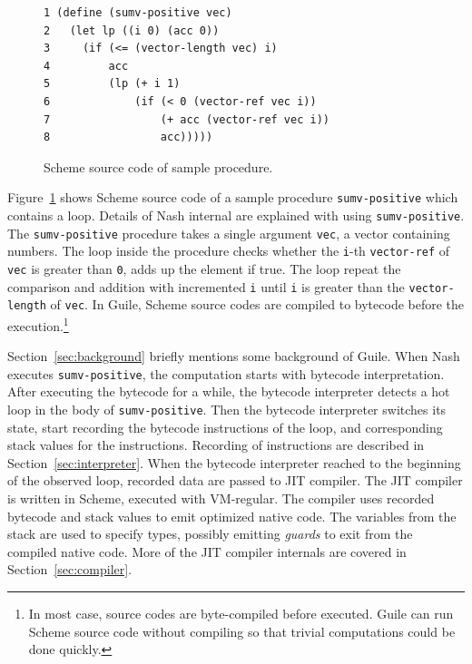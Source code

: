 \documentclass[preprint, 10pt]{sigplanconf}
\begin{document}
\begin{figure}
  \begin{center}
    \small
\begin{verbatim}
1 (define (sumv-positive vec)
2   (let lp ((i 0) (acc 0))
3     (if (<= (vector-length vec) i)
4         acc
5         (lp (+ i 1)
6             (if (< 0 (vector-ref vec i))
7                 (+ acc (vector-ref vec i))
8                 acc)))))
\end{verbatim}
\end{center}
\caption{Scheme source code of sample procedure.}
\label{fig:scmloop}
\end{figure}

Figure~\hyperref[fig:scmloop]{\ref{fig:scmloop}} shows Scheme source code of a
sample procedure \texttt{sumv-positive} which contains a loop. Details of Nash
internal are explained with using \texttt{sumv-positive}. The
\texttt{sumv-positive} procedure takes a single argument \texttt{vec}, a vector
containing numbers. The loop inside the procedure checks whether the
\texttt{i}-th \texttt{vector-ref} of \texttt{vec} is greater than \texttt{0},
adds up the element if true. The loop repeat the comparison and addition with
incremented \texttt{i} until \texttt{i} is greater than the
\texttt{vector-length} of \texttt{vec}. In Guile, Scheme source codes are
compiled to bytecode before the execution.\footnote{In most case, source codes
  are byte-compiled before executed. Guile can run Scheme source code without
  compiling so that trivial computations could be done quickly.}

Section~\hyperref[sec:background]{\ref{sec:background}} briefly mentions some
background of Guile. When Nash executes \texttt{sumv-positive}, the computation
starts with bytecode interpretation. After executing the bytecode for a while,
the bytecode interpreter detects a hot loop in the body of
\texttt{sumv-positive}. Then the bytecode interpreter switches its state, start
recording the bytecode instructions of the loop, and corresponding stack values
for the instructions. Recording of instructions are described in
Section~\hyperref[sec:interpreter]{\ref{sec:interpreter}}. When the bytecode
interpreter reached to the beginning of the observed loop, recorded data are
passed to JIT compiler. The JIT compiler is written in Scheme, executed with
VM-regular. The compiler uses recorded bytecode and stack values to emit
optimized native code. The variables from the stack are used to specify types,
possibly emitting \textit{guards} to exit from the compiled native code. More of
the JIT compiler internals are covered in
Section~\hyperref[sec:compiler]{\ref{sec:compiler}}.
\end{document}

